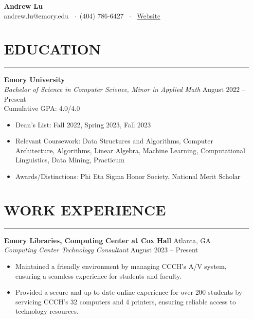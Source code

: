 \documentclass[10.5pt]{article}
\begin{document}
\noindent
\begin{center}
{\Large \textbf{\fontsize{14pt}{14pt}\selectfont Andrew Lu}} \\
andrew.lu@emory.edu \faEnvelope~$\cdot$~(404) 786-6427 \faPhone~$\cdot$~
\href{https://andrewtlu.github.io}{Website  \faInfo}
\end{center}

\section*{\large\textbf{EDUCATION}}
\vspace{-\baselineskip}
\noindent\rule{\textwidth}{0.4pt}

\noindent
\textbf{Emory University} \\
\emph{Bachelor of Science in Computer Science, Minor in Applied Math} \hfill August 2022 -- Present \\ 
Cumulative GPA: 4.0/4.0 
\begin{itemize}
\item Dean's List: Fall 2022, Spring 2023, Fall 2023
\item Relevant Coursework: Data Structures and Algorithms, Computer Architecture, Algorithms, Linear Algebra, Machine Learning, Computational Linguistics, Data Mining, Practicum
\item Awards/Distinctions: Phi Eta Sigma Honor Society, National Merit Scholar
\end{itemize}
 \vspace{-\baselineskip}
\section*{\large\textbf{WORK EXPERIENCE}} 
 \vspace{-\baselineskip} 
\noindent\rule{\textwidth}{0.4pt} 


\noindent
\textbf{Emory Libraries, Computing Center at Cox Hall} \hfill {Atlanta, GA}\\
\emph{Computing Center Technology Consultant} \hfill {August 2023} -- {Present}
\begin{itemize}
    \item Maintained a friendly environment by managing CCCH's A/V system, ensuring a seamless experience for students and faculty. \item Provided a secure and up-to-date online experience for over 200 students by servicing CCCH's 32 computers and 4 printers, ensuring reliable access to technology resources.
\end{itemize}
\end{document}
